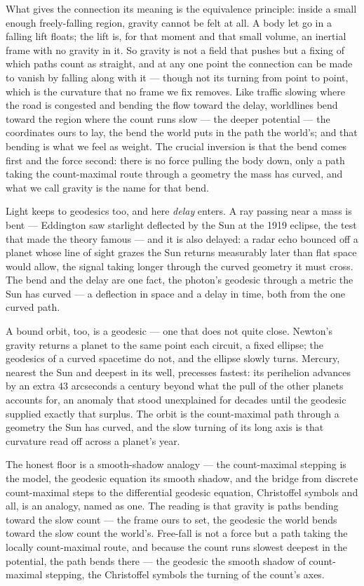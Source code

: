 What gives the connection its meaning is the equivalence principle: inside a small enough freely-falling region,
gravity cannot be felt at all. A body let go in a falling lift floats; the lift is, for that moment and that
small volume, an inertial frame with no gravity in it. So gravity is not a field that pushes but a fixing of
which paths count as straight, and at any one point the connection can be made to vanish by falling along with
it --- though not its turning from point to point, which is the curvature that no frame we fix removes. Like
traffic slowing where the road is congested and bending the flow toward the delay, worldlines bend toward the
region where the count runs slow --- the deeper potential --- the coordinates ours to lay, the bend the world
puts in the path the world's; and that bending is what we feel as weight. The
crucial inversion is that the bend comes first and the force second: there is no force pulling the body down,
only a path taking the count-maximal route through a geometry the mass has curved, and what we call gravity is
the name for that bend.

Light keeps to geodesics too, and here \emph{delay} enters. A ray passing near a mass is bent --- Eddington saw starlight deflected by the Sun at the 1919
eclipse, the test that made the theory famous --- and it is also delayed: a radar echo bounced off a planet
whose line of sight grazes the Sun returns measurably later than flat space would allow, the signal taking
longer through the curved geometry it must cross. The bend and the delay are one fact, the photon's geodesic
through a metric the Sun has curved --- a deflection in space and a delay in time, both from the one curved path.

A bound orbit, too, is a geodesic --- one that does not quite close. Newton's gravity returns a planet to the
same point each circuit, a fixed ellipse; the geodesics of a curved spacetime do not, and the ellipse slowly
turns. Mercury, nearest the Sun and deepest in its well, precesses fastest: its perihelion advances by an extra
$43$ arcseconds a century beyond what the pull of the other planets accounts for, an anomaly that stood
unexplained for decades until the geodesic supplied exactly that surplus. The orbit is the count-maximal path
through a geometry the Sun has curved, and the slow turning of its long axis is that curvature read off across
a planet's year.

The honest floor is a smooth-shadow analogy --- the count-maximal stepping is the model, the geodesic equation
its smooth shadow, and the bridge from discrete count-maximal steps to the differential geodesic equation,
Christoffel symbols and all, is an analogy, named as one. The reading is that gravity is paths bending toward the slow count --- the frame ours to set, the geodesic the
world bends toward the slow count the world's. Free-fall is not a force but a path taking the locally
count-maximal route, and because the
count runs slowest deepest in the potential, the path bends there --- the geodesic the smooth shadow of
count-maximal stepping, the Christoffel symbols the turning of the count's axes.

